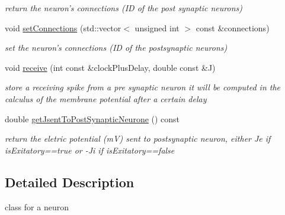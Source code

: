 \begin{DoxyCompactItemize}
\begin{DoxyCompactList}\small\item\em return the neuron's connections (I\-D of the post synaptic neurons) \end{DoxyCompactList}\item 
\hypertarget{classNeurone_a60b8bf2108296a7ae8be2f7eae29547a}{void \hyperlink{classNeurone_a60b8bf2108296a7ae8be2f7eae29547a}{set\-Connections} (std\-::vector$<$ unsigned int $>$ const \&connections)}\label{classNeurone_a60b8bf2108296a7ae8be2f7eae29547a}

\begin{DoxyCompactList}\small\item\em set the neuron's connections (I\-D of the postsynaptic neurons) \end{DoxyCompactList}\item 
void \hyperlink{classNeurone_abf87a70742b3662bc294d570484d1f59}{receive} (int const \&clock\-Plus\-Delay, double const \&J)
\begin{DoxyCompactList}\small\item\em store a receiving spike from a pre synaptic neuron it will be computed in the calculus of the membrane potential after a certain delay \end{DoxyCompactList}\item 
\hypertarget{classNeurone_ac7746b1b83936b6e665aee632da0a131}{double \hyperlink{classNeurone_ac7746b1b83936b6e665aee632da0a131}{get\-Jsent\-To\-Post\-Synaptic\-Neurone} () const }\label{classNeurone_ac7746b1b83936b6e665aee632da0a131}

\begin{DoxyCompactList}\small\item\em return the eletric potential (m\-V) sent to postsynaptic neuron, either Je if is\-Exitatory==true or -\/\-Ji if is\-Exitatory==false \end{DoxyCompactList}\end{DoxyCompactItemize}


\subsection{Detailed Description}
class for a neuron 

